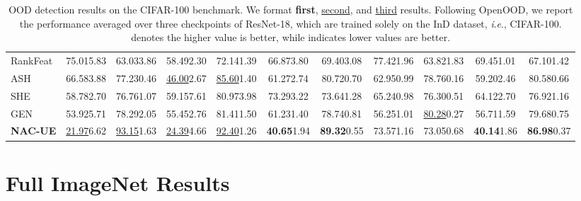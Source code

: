 \documentclass{article} \usepackage{iclr2024_conference,times}
\newcommand{\ie}{\textit{i}.\textit{e}.}
\begin{document}
\begin{table*}[h]
{\begin{tabular}{l cc cc cc cc cc}
			RankFeat & 75.01{\tiny5.83} &  63.03{\tiny3.86} &  58.49{\tiny2.30} &  72.14{\tiny1.39} &  66.87{\tiny3.80} &  69.40{\tiny3.08} &  77.42{\tiny1.96} &  63.82{\tiny1.83} &  69.45{\tiny1.01} &  67.10{\tiny1.42 }\\ 
			ASH & 66.58{\tiny3.88} &  77.23{\tiny0.46} &  \underline{46.00}{\tiny2.67} &  \underline{85.60}{\tiny1.40} &  61.27{\tiny2.74} &  80.72{\tiny0.70} &  62.95{\tiny0.99} &  78.76{\tiny0.16} &  59.20{\tiny2.46} &  80.58{\tiny0.66 }\\ 
			SHE & 58.78{\tiny2.70} &  76.76{\tiny1.07} &  59.15{\tiny7.61} &  80.97{\tiny3.98} &  73.29{\tiny3.22} &  73.64{\tiny1.28} &  65.24{\tiny0.98} &  76.30{\tiny0.51} &  64.12{\tiny2.70} &  76.92{\tiny1.16 }\\ 
			GEN & 53.92{\tiny5.71} &  78.29{\tiny2.05} &  55.45{\tiny2.76} &  81.41{\tiny1.50} &  61.23{\tiny1.40} &  78.74{\tiny0.81} &  56.25{\tiny1.01} &  \underline{80.28}{\tiny0.27} &  56.71{\tiny1.59} &  79.68{\tiny0.75 }\\ 
			\rowcolor{LightGray}
			\textbf{NAC-UE} & \underline{21.97}{\tiny6.62 } &  \underline{93.15}{\tiny1.63 } &  \underline{24.39}{\tiny4.66 } &  \underline{92.40}{\tiny1.26 } &  \textbf{40.65}{\tiny1.94 } &  \textbf{89.32}{\tiny0.55 } &  73.57{\tiny1.16  } &  73.05{\tiny0.68 } &  \textbf{40.14}{\tiny1.86 } &  \textbf{86.98}{\tiny0.37 }\\ 
			
			\bottomrule
		\end{tabular}
		
	}
	\caption{OOD detection results on the CIFAR-100 benchmark. We format \textbf{first}, \underline{second}, and \underline{third} results. 
		Following OpenOOD, we report the performance averaged over three checkpoints of ResNet-18, which are trained solely on the InD dataset, \ie, CIFAR-100.  denotes the higher value is better, while  indicates lower values are better.}
	\label{Appendix:Tab:Full_OOD_Detection_CiFAR100}
	\vspace{-2mm}
\end{table*}







\clearpage
\section{Full ImageNet Results}
\end{document}
